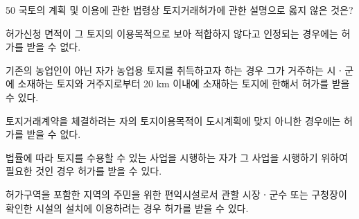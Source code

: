 \begin{question}{50}
국토의 계획 및 이용에 관한 법령상 토지거래허가에 관한 설명으로 옳지 않은 것은?
\begin{choices}
  \item 허가신청 면적이 그 토지의 이용목적으로 보아 적합하지 않다고 인정되는 경우에는 허가를 받을 수 없다.
  \item 기존의 농업인이 아닌 자가 농업용 토지를 취득하고자 하는 경우 그가 거주하는 시ㆍ군에 소재하는 토지와 거주지로부터 20 km 이내에 소재하는 토지에 한해서 허가를 받을 수 있다.
  \item 토지거래계약을 체결하려는 자의 토지이용목적이 도시계획에 맞지 아니한 경우에는 허가를 받을 수 없다.
  \item 법률에 따라 토지를 수용할 수 있는 사업을 시행하는 자가 그 사업을 시행하기 위하여 필요한 것인 경우 허가를 받을 수 있다.
  \item 허가구역을 포함한 지역의 주민을 위한 편익시설로서 관할 시장ㆍ군수 또는 구청장이 확인한 시설의 설치에 이용하려는 경우 허가를 받을 수 있다.
\end{choices}
\end{question}
